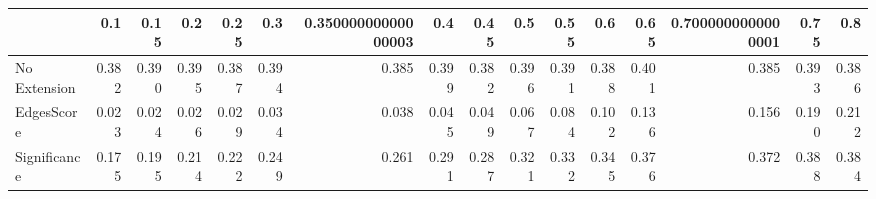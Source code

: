 \begin{tabular}{lrrrrrrrrrrrrrrr}
\toprule
{} &   0.1 &  0.15 &   0.2 &  0.25 &   0.3 & 0.35000000000000003 &   0.4 &  0.45 &   0.5 &  0.55 &   0.6 &  0.65 & 0.7000000000000001 &  0.75 &   0.8 \\
\midrule
No Extension & 0.382 & 0.390 & 0.395 & 0.387 & 0.394 &               0.385 & 0.399 & 0.382 & 0.396 & 0.391 & 0.388 & 0.401 &              0.385 & 0.393 & 0.386 \\
EdgesScore   & 0.023 & 0.024 & 0.026 & 0.029 & 0.034 &               0.038 & 0.045 & 0.049 & 0.067 & 0.084 & 0.102 & 0.136 &              0.156 & 0.190 & 0.212 \\
Significance & 0.175 & 0.195 & 0.214 & 0.222 & 0.249 &               0.261 & 0.291 & 0.287 & 0.321 & 0.332 & 0.345 & 0.376 &              0.372 & 0.388 & 0.384 \\
\bottomrule
\end{tabular}
